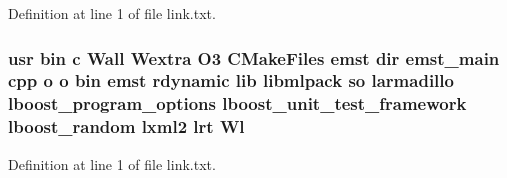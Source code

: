 Definition at line 1 of file link.\-txt.

\subsubsection[{Wl}]{\setlength{\rightskip}{0pt plus 5cm}usr bin c Wall Wextra O3 C\-Make\-Files emst dir emst\-\_\-main cpp o o bin emst rdynamic lib libmlpack so larmadillo lboost\-\_\-program\-\_\-options lboost\-\_\-unit\-\_\-test\-\_\-framework lboost\-\_\-random lxml2 lrt Wl}\label{methods_2emst_2CMakeFiles_2emst_8dir_2link_8txt_ad082ab6e82369e2ddf8acea4ed89628b}


Definition at line 1 of file link.\-txt.

